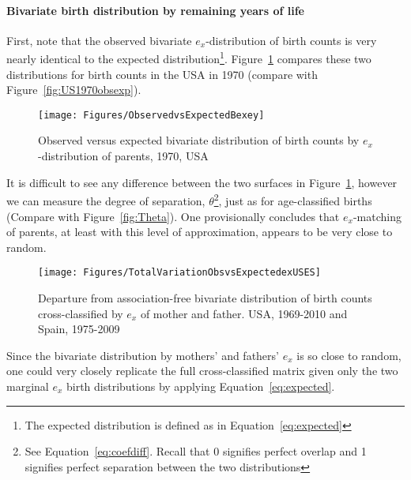\paragraph{Bivariate birth distribution by remaining years of life}

First, note that the observed bivariate $e_x$-distribution of birth counts is
very nearly identical to the expected distribution\footnote{The expected
distribution is defined as in Equation~\eqref{eq:expected}}.
Figure~\ref{fig:US1970obsexpex} compares these two distributions for birth counts in the USA in 1970 (compare with Figure~\ref{fig:US1970obsexp}). 

\begin{figure}[ht!]
        \centering  
          \caption{Observed versus expected bivariate
          distribution of birth counts by $e_x$-distribution of parents, 1970,
          USA}
           \texttt{[image: Figures/ObservedvsExpectedBexey]}
          \label{fig:US1970obsexpex}
\end{figure}

It is
difficult to see any difference between the two surfaces in
Figure~\ref{fig:US1970obsexpex}, however we can measure the degree of
separation, $\theta$\footnote{See Equation~\eqref{eq:coefdiff}. Recall that 0 signifies
perfect overlap and 1 signifies perfect separation between the two
distributions}, just as for age-classified births (Compare with
Figure~\ref{fig:Theta}). One provisionally concludes that $e_x$-matching of
parents, at least with this level of approximation, appears to be very close to random.

\begin{figure}[ht!]
        \centering  
          \caption{Departure from association-free bivariate distribution of
          birth counts cross-classified by $e_x$ of mother and father. USA,
          1969-2010 and Spain, 1975-2009}
           \texttt{[image: Figures/TotalVariationObsvsExpectedexUSES]}
          \label{fig:TotalVarobsexpex}
\end{figure}

Since the bivariate distribution by mothers' and fathers' $e_x$ is so close
to random, one could very closely replicate the full cross-classified matrix 
given only the two marginal
$e_x$ birth distributions by applying Equation~\eqref{eq:expected}. 





